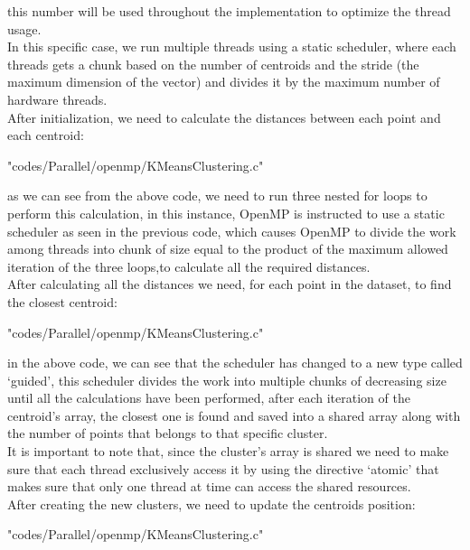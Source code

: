 \documentclass[10pt,twocolumn,letterpaper]{article}
\begin{document}
this number will be used throughout the implementation to optimize the thread usage.\\
In this specific case, we run multiple threads using a static scheduler, where each threads gets a chunk based on the number of 
centroids and the stride (the maximum dimension of the vector) and divides it by the maximum number of hardware threads.\\
After initialization, we need to calculate the distances between each point and each centroid:\\

\begin{lstinputlisting}[language=C,style=CSnippetStyle,caption=OpenMP Distance Calculation,firstline=29,lastline=41]
					   {"codes/Parallel/openmp/KMeansClustering.c"}
\end{lstinputlisting}
as we can see from the above code, we need to run three nested for loops to perform this calculation, in this instance, OpenMP 
is instructed to use a static scheduler as seen in the previous code, which causes OpenMP to divide the work among threads into
chunk of size equal to the product of the maximum allowed iteration of the three loops,to calculate all the required distances.\\
After calculating all the distances we need, for each point in the dataset, to find the closest centroid:\\
\begin{lstinputlisting}[language=C,style=CSnippetStyle,caption=OpenMP Nearest Centroid Calculation,firstline=45,lastline=61]
					   {"codes/Parallel/openmp/KMeansClustering.c"}
\end{lstinputlisting}
in the above code, we can see that the scheduler has changed to a new type called `guided', this scheduler divides the work 
into multiple chunks of decreasing size until all the calculations have been performed, after each iteration of the centroid's
array, the closest one is found and saved into a shared array along with the number of points that belongs to that specific 
cluster.\\
It is important to note that, since the cluster's array is shared we need to make sure that each thread exclusively access it 
by using the directive `atomic' that makes sure that only one thread at time can access the shared resources.\\
After creating the new clusters, we need to update the centroids position:\\
\begin{lstinputlisting}[language=C,style=CSnippetStyle,caption=OpenMP Mean Calculation I,firstline=63,lastline=72]
					   {"codes/Parallel/openmp/KMeansClustering.c"}
\end{lstinputlisting}
\end{document}
